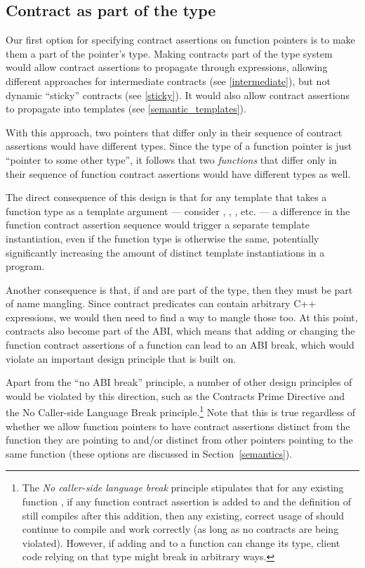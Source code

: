 \subsection{Contract as part of the type}
\label{type}

Our first option for specifying contract assertions on function pointers is to make them a part of the pointer's type. Making contracts part of the type system would allow contract assertions to propagate through expressions, allowing different approaches for intermediate contracts (see \ref{intermediate}), but not dynamic ``sticky'' contracts (see \ref{sticky}). It would also allow contract assertions to propagate into templates (see \ref{semantic_templates}). 

With this approach, two pointers that differ only in their sequence of contract assertions would have different types. Since the type of a function pointer is just ``pointer to some other type'', it follows that two \emph{functions} that differ only in their sequence of function contract assertions would have different types as well.

The direct consequence of this design is that for any template that takes a function type as a template argument --- consider , , , etc. --- a difference in the function contract assertion sequence would trigger a separate template instantiation, even if the function type is otherwise the same, potentially significantly increasing the amount of distinct template instantiations in a program. 

Another consequence is that, if  and  are part of the type,  then they must be part of name mangling. Since contract predicates can contain arbitrary C++ expressions, we would then need to find a way to mangle those too. At this point, contracts also become part of the ABI, which means that adding or changing the function contract assertions of a function can lead to an ABI break, which would violate an important design principle that \cite{P2900R8} is built on.

Apart from the ``no ABI break'' principle, a number of other design principles of \cite{P2900R8} would be violated by this direction, such as the Contracts Prime Directive and the No Caller-side Language Break principle.\footnote{ The \emph{No caller-side language break} principle stipulates that for any existing function , if any function contract assertion is added to  and the definition of  still compiles after this addition, then any existing, correct usage of  should continue to compile and work correctly (as long as no contracts are being violated). However, if adding  and  to a function can change its type, client code relying on that type might break in arbitrary ways.} Note that this is true regardless of whether we allow function pointers to have contract assertions distinct from the function they are pointing to and/or distinct from other pointers pointing to the same function (these options are discussed in Section~\ref{semantics}).

